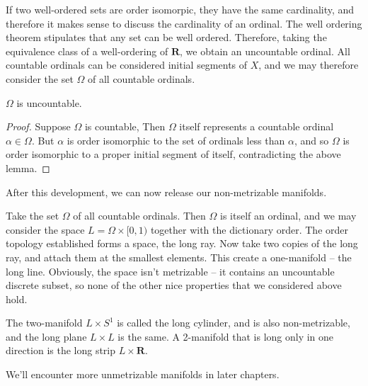 If two well-ordered sets are order isomorpic, they have the same cardinality, and therefore it makes sense to discuss the cardinality of an ordinal. The well ordering theorem stipulates that any set can be well ordered. Therefore, taking the equivalence class of a well-ordering of $\mathbf{R}$, we obtain an uncountable ordinal. All countable ordinals can be considered initial segments of $X$, and we may therefore consider the set $\Omega$ of all countable ordinals.

\begin{theorem}
    $\Omega$ is uncountable.
\end{theorem}
\begin{proof}
    Suppose $\Omega$ is countable, Then $\Omega$ itself represents a countable ordinal $\alpha \in \Omega$. But $\alpha$ is order isomorphic to the set of ordinals less than $\alpha$, and so $\Omega$ is order isomorphic to a proper initial segment of itself, contradicting the above lemma.
\end{proof}

After this development, we can now release our non-metrizable manifolds.

\begin{example}
    Take the set $\Omega$ of all countable ordinals. Then $\Omega$ is itself an ordinal, and we may consider the space $L = \Omega \times [0,1)$ together with the dictionary order. The order topology established forms a space, the long ray. Now take two copies of the long ray, and attach them at the smallest elements. This create a one-manifold -- the long line. Obviously, the space isn't metrizable -- it contains an uncountable discrete subset, so none of the other nice properties that we considered above hold.
\end{example}

\begin{example}
    The two-manifold $L \times S^1$ is called the long cylinder, and is also non-metrizable, and the long plane $L \times L$ is the same. A 2-manifold that is long only in one direction is the long strip $L \times \mathbf{R}$.
\end{example}

We'll encounter more unmetrizable manifolds in later chapters.




















